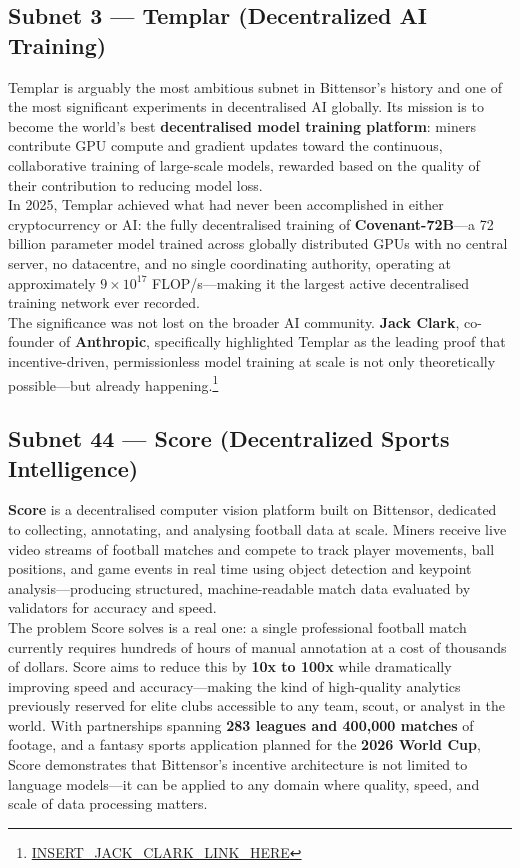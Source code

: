 \documentclass[12pt, a4paper, oneside]{report}
\theoremstyle{definition}
\begin{document}
\subsection*{Subnet 3 — Templar (Decentralized AI Training)}
Templar is arguably the most ambitious subnet in Bittensor's history and 
one of the most significant experiments in decentralised AI globally. Its 
mission is to become the world's best \textbf{decentralised model training 
platform}: miners contribute GPU compute and gradient updates toward the 
continuous, collaborative training of large-scale models, rewarded based 
on the quality of their contribution to reducing model loss.\\[0.4cm]

In 2025, Templar achieved what had never been accomplished in either 
cryptocurrency or AI: the fully decentralised training of 
\textbf{Covenant-72B}—a 72 billion parameter model trained across globally 
distributed GPUs with no central server, no datacentre, and no single 
coordinating authority, operating at approximately $9 \times 10^{17}$ 
FLOP/s—making it the largest active decentralised training network ever 
recorded.\\[0.4cm]

The significance was not lost on the broader AI community. \textbf{Jack Clark}, 
co-founder of \textbf{Anthropic}, specifically highlighted Templar as the 
leading proof that incentive-driven, permissionless model training at scale 
is not only theoretically possible—but already 
happening.\footnote{\url{INSERT_JACK_CLARK_LINK_HERE}}

\subsection*{Subnet 44 — Score (Decentralized Sports Intelligence)}
\textbf{Score} is a decentralised computer vision platform built on Bittensor, 
dedicated to collecting, annotating, and analysing football data at scale. 
Miners receive live video streams of football matches and compete to track 
player movements, ball positions, and game events in real time using object 
detection and keypoint analysis—producing structured, machine-readable 
match data evaluated by validators for accuracy and speed.\\[0.4cm]

The problem Score solves is a real one: a single professional football match 
currently requires hundreds of hours of manual annotation at a cost of 
thousands of dollars. Score aims to reduce this by \textbf{10x to 100x} 
while dramatically improving speed and accuracy—making the kind of 
high-quality analytics previously reserved for elite clubs accessible to 
any team, scout, or analyst in the world. With partnerships spanning 
\textbf{283 leagues and 400,000 matches} of footage, and a fantasy sports 
application planned for the \textbf{2026 World Cup}, Score demonstrates 
that Bittensor's incentive architecture is not limited to language 
models—it can be applied to any domain where quality, speed, and scale 
of data processing matters.
\end{document}

